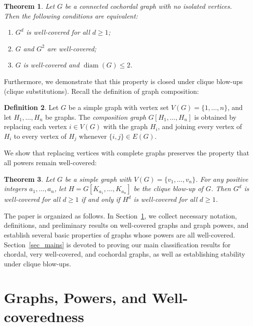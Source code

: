 \documentclass[12pt]{amsart}
\numberwithin{equation}{section}
\newtheorem{thm}{\bf Theorem}[section]
\theoremstyle{definition}
\newtheorem{defn}[thm]{Definition}
\begin{document}
\begin{thm}\label{thm_cochor}
Let $G$ be a connected cochordal graph with no isolated vertices. Then the following conditions are equivalent:
\begin{enumerate}
    \item $G^d$ is well-covered for all $d \ge 1$;
    \item $G$ and $G^2$ are well-covered;
    \item $G$ is well-covered and $\operatorname{diam}(G) \le 2$.
\end{enumerate}
\end{thm}

Furthermore, we demonstrate that this property is closed under clique blow-ups (clique substitutions). Recall the definition of graph composition:

\begin{defn}
Let $G$ be a simple graph with vertex set $V(G) = \{1, \ldots, n\}$, and let $H_1, \ldots, H_n$ be graphs. The \emph{composition graph} $G[H_1, \ldots, H_n]$ is obtained by replacing each vertex $i \in V(G)$ with the graph $H_i$, and joining every vertex of $H_i$ to every vertex of $H_j$ whenever $\{i, j\} \in E(G)$.
\end{defn}

We show that replacing vertices with complete graphs preserves the property that all powers remain well-covered:

\begin{thm}\label{thm_clique_blowup}
Let $G$ be a simple graph with $V(G) = \{v_1, \ldots, v_n\}$. For any positive integers $a_1, \ldots, a_n$, let $H = G[K_{a_1}, \ldots, K_{a_n}]$ be the clique blow-up of $G$. Then $G^d$ is well-covered for all $d \ge 1$ if and only if $H^d$ is well-covered for all $d \ge 1$.
\end{thm}

The paper is organized as follows. In Section~\ref{sec_prelim}, we collect necessary notation, definitions, and preliminary results on well-covered graphs and graph powers, and establish several basic properties of graphs whose powers are all well-covered. Section~\ref{sec_mains} is devoted to proving our main classification results for chordal, very well-covered, and cochordal graphs, as well as establishing stability under clique blow-ups.

\section{Graphs, Powers, and Well-coveredness}\label{sec_prelim}
\end{document}
